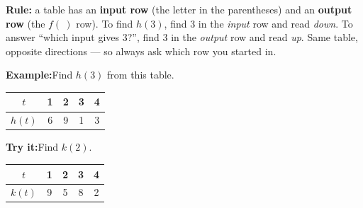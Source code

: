 \documentclass[12pt]{article}
\begin{document}
\begin{formulabox}\textbf{Rule:} a table has an \textbf{input row} (the letter
in the parentheses) and an \textbf{output row} (the $f(\ )$ row). To find
$h(3)$, find $3$ in the \emph{input} row and read \emph{down}. To answer ``which
input gives $3$?'', find $3$ in the \emph{output} row and read \emph{up}. Same
table, opposite directions --- so always ask which row you started in.
\end{formulabox}
\begin{examplebox}\textbf{Example:}\quad Find $h(3)$ from this table.
\begin{center}\small
\begin{tabular}{|c|c|c|c|c|}\hline
$t$ & 1 & 2 & 3 & 4 \\\hline
$h(t)$ & 6 & 9 & 1 & 3 \\\hline
\end{tabular}
\end{center}
\end{examplebox}
\begin{tryitbox}\textbf{Try it:}\quad Find $k(2)$.
\begin{center}\small
\begin{tabular}{|c|c|c|c|c|}\hline
$t$ & 1 & 2 & 3 & 4 \\\hline
$k(t)$ & 9 & 5 & 8 & 2 \\\hline
\end{tabular}
\end{center}
\end{tryitbox}
\end{document}
